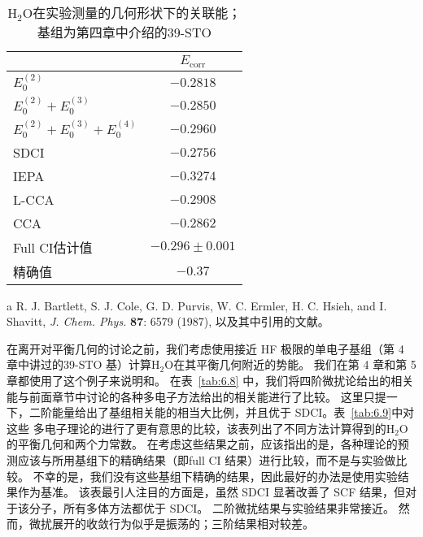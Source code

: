 \begin{table}
	\centering
	\caption{$\mathrm{H_2O}$在实验测量的几何形状下的关联能；基组为第四章中介绍的39-STO}
	\begin{threeparttable}
		\begin{tabular}{l@{\hspace{2.5cm}}c}
			\hline & \multicolumn{1}{c}{$E_{\text {corr}}$} \\
			\hline$E_0^{(2)}$ & $-0.2818$ \\
			$E_0^{(2)}+E_0^{(3)}$ & $-0.2850$ \\
			$E_0^{(2)}+E_0^{(3)}+E_0^{(4)}$ & $-0.2960$ \\
			SDCI & $-0.2756$ \\
			IEPA & $-0.3274$ \\
			L-CCA & $-0.2908$ \\
			CCA & $-0.2862$ \\
			Full CI估计值 & $-0.296 \pm 0.001$ \\
			精确值 & $-0.37$ \\
			\hline
		\end{tabular}
	\begin{tablenotes}
		\item[a] R. J. Bartlett, S. J. Cole, G. D. Purvis, W. C. Ermler, H. C. Hsieh, and I. Shavitt, \textit{J. Chem. Phys.} \textbf{87}: 6579 (1987), 以及其中引用的文献。
	\end{tablenotes}
	\end{threeparttable}
	\label{tab:6.8}
\end{table}

在离开对平衡几何的讨论之前，我们考虑使用接近 HF 极限的单电子基组（第 4 章中讲过的39-STO 基）计算$\mathrm{H_2O}$在其平衡几何附近的势能。 我们在第 4 章和第 5 章都使用了这个例子来说明和。 在表~\autoref{tab:6.8} 中，我们将四阶微扰论给出的相关能与前面章节中讨论的各种多电子方法给出的相关能进行了比较。 这里只提一下，二阶能量给出了基组相关能的相当大比例，并且优于 SDCI。表~\autoref{tab:6.9}中对这些
多电子理论的进行了更有意思的比较，该表列出了不同方法计算得到的$\mathrm{H_2O}$的平衡几何和两个力常数。 在考虑这些结果之前，应该指出的是，各种理论的预测应该与所用基组下的精确结果（即full CI 结果）进行比较，而不是与实验做比较。 不幸的是，我们没有这些基组下精确的结果，因此最好的办法是使用实验结果作为基准。 该表最引人注目的方面是，虽然 SDCI 显著改善了 SCF 结果，但对于该分子，所有多体方法都优于 SDCI。 二阶微扰结果与实验结果非常接近。 然而，微扰展开的收敛行为似乎是振荡的；三阶结果相对较差。

